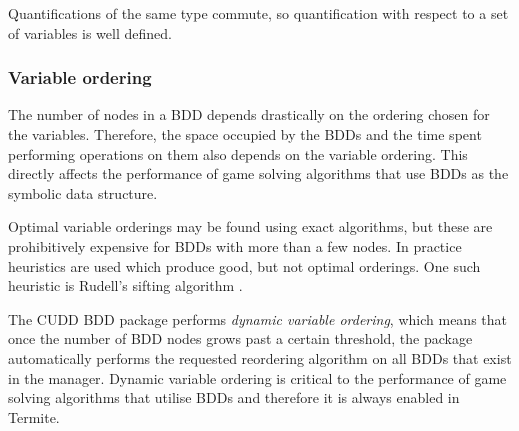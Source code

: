 Quantifications of the same type commute, so quantification with respect to a set of variables is well defined. 

\subsubsection{Variable ordering}

The number of nodes in a BDD depends drastically on the ordering chosen for the variables. Therefore, the space occupied by the BDDs and the time spent performing operations on them also depends on the variable ordering. This directly affects the performance of game solving algorithms that use BDDs as the symbolic data structure. 

Optimal variable orderings may be found using exact algorithms, but these are prohibitively expensive for BDDs with more than a few nodes. In practice heuristics are used which produce good, but not optimal orderings. One such heuristic is Rudell's sifting algorithm \cite{Rudell_1993}.

The CUDD BDD package performs \emph{dynamic variable ordering}, which means that once the number of BDD nodes grows past a certain threshold, the package automatically performs the requested reordering algorithm on all BDDs that exist in the manager. Dynamic variable ordering is critical to the performance of game solving algorithms that utilise BDDs and therefore it is always enabled in Termite.

